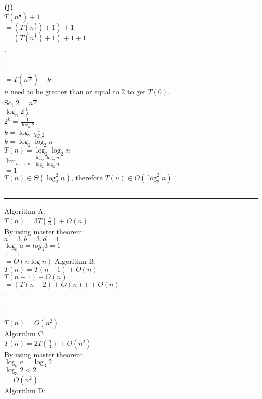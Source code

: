 \documentclass[a4paper, 11pt]{article}
\newcommand{\question}[2] {\vspace{.25in} \hrule\vspace{0.5em}
\noindent{\bf #1: #2} \vspace{0.5em}
\hrule \vspace{.10in}}
\renewcommand{\part}[1] {\vspace{.10in} {\bf (#1)}}
\begin{document}
\part{j}\\
$T(n^{\frac{1}{2}})+1$\\
$=(T(n^{\frac{1}{4}})+1)+1$\\
$=(T(n^{\frac{1}{8}})+1)+1+1$\\
.\\
.\\
.\\
$=T(n^{\frac{1}{2^{k}}})+k$\\
$n$ need to be greater than or equal to $2$ to get $T(0)$.\\
So, $2 = n^{\frac{1}{2^{k}}}$\\
$\log_{n} 2 \frac{1}{2^{k}}$\\
$2^{k} = \frac{1}{\log_{n} 2}$\\
$k = \log_2 \frac{1}{log_{n} 2}$\\
$k = \log_2\log_2 n$\\
$T(n)=\log_2\log_2 n$\\
$\lim_{n\to\infty} \frac{\log_2\log_2 n}{\log_2\log_2 n}$\\
$=1$\\
$T(n)\in\Theta(\log_2^{2} n)$, therefore $T(n)\in O(\log_2^{2} n)$
\question{2}{Part2}
Algorithm A:\\
$T(n)=3T(\frac{b}{3})+O(n)$\\
By using master theorem:\\
$a=3, b=3, d=1$\\
$\log_{b} a = log_3 3 = 1$\\
$1=1$\\
$=O(n\log n)$
Algorithm B:\\
$T(n) = T(n-1)+O(n)$\\
$T(n-1)+O(n)$\\
$=(T(n-2)+O(n))+O(n)$\\
.\\
.\\
.\\
$T(n)=O(n^{2})$\\
Algorithm C:\\
$T(n)=2T(\frac{n}{3})+O(n^{2})$\\
By using master theorem:\\
$\log_{b} a = \log_{3} 2$\\
$\log_{3} 2 < 2$\\
$=O(n^{2})$\\
Algorithm D:\\
\end{document}

